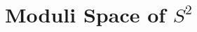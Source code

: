 \documentclass[../Moduli_Spaces_of_Riemann_Surfaces.tex]{subfiles}
\begin{document}
    \section{Moduli Space of $S^2$}
\end{document}
